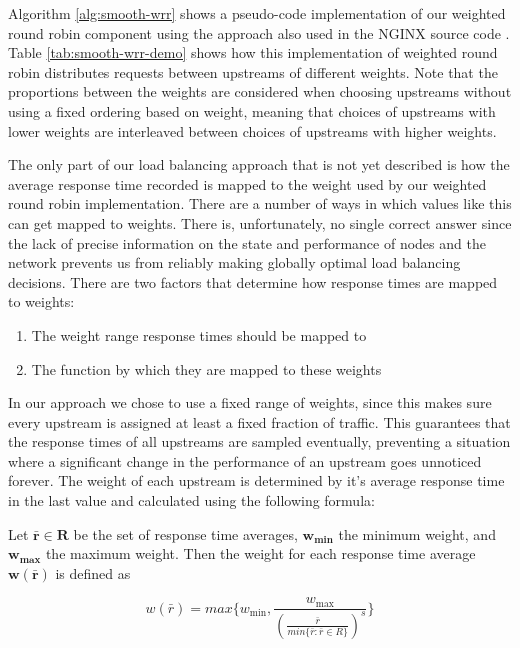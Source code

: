 



Algorithm \ref{alg:smooth-wrr} shows a pseudo-code implementation of our weighted round robin component using the approach also used in the NGINX source code \cite{nginx-wrr}.
Table \ref{tab:smooth-wrr-demo} shows how this implementation of weighted round robin distributes requests between upstreams of different weights. Note that the proportions between the weights are considered when choosing upstreams without using a fixed ordering based on weight, meaning that choices of upstreams with lower weights are interleaved between choices of upstreams with higher weights. %

The only part of our load balancing approach that is not yet described is how the average response time recorded is mapped to the weight used by our weighted round robin implementation.
There are a number of ways in which values like this can get mapped to weights.
There is, unfortunately, no single correct answer since the lack of precise information on the state and performance of nodes and the network prevents us from reliably making globally optimal load balancing decisions.
There are two factors that determine how response times are mapped to weights:
\begin{enumerate}
    \item The weight range response times should be mapped to
    \item The function by which they are mapped to these weights
\end{enumerate}

In our approach we chose to use a fixed range of weights, since this makes sure every upstream is assigned at least a fixed fraction of traffic.
This guarantees that the response times of all upstreams are sampled eventually, preventing a situation where a significant change in the performance of an upstream goes unnoticed forever.
The weight of each upstream is determined by it's average response time in the last value and calculated using the following formula:

Let $\mathbf{\bar{r} \in R}$ be the set of response time averages, $\mathbf{w_{\text{min}}}$ the minimum weight, and $\mathbf{w_{\text{max}}}$ the maximum weight. Then the weight for each response time average $\mathbf{w(\bar{r})}$ is defined as

\[ w(\bar{r}) = max\{w_{\text{min}}, \frac{w_{\text{max}}}{(\frac{\bar{r}}{min\{\bar{r}: \bar{r} \in R\}})^{s}}\} \]

